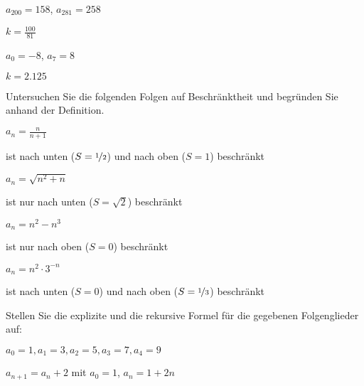 \begin{exercisesK}
\begin{exercise} $a_{200}=158$, $a_{281}=258$ \begin{answer}  $k=\frac{100}{81}$
\end{answer}
\end{exercise}

\begin{exercise} $a_{0}=-8$, $a_{7}=8$ \begin{answer}  $k=2.125$
\end{answer}
\end{exercise}
\endtwocol

Untersuchen Sie die folgenden Folgen auf Beschränktheit und begründen Sie anhand der Definition.

\twocol

\begin{exercise}$a_{n} = \frac{n}{n+1}$ \begin{answer}  ist nach unten ($S=\nicefrac{1}{2}$) und nach oben ($S=1$) beschränkt
\end{answer}
\end{exercise}

\begin{exercise}$a_{n} = \sqrt{n^{2}+n} $ \begin{answer}  ist nur nach unten ($S=\sqrt{2}$) beschränkt
\end{answer}
\end{exercise}

\begin{exercise}$a_{n} = n^{2} -n^{3} $ \begin{answer}  ist nur nach oben ($S=0$) beschränkt
\end{answer}
\end{exercise}

\begin{exercise}$a_{n} = n^{2}\cdot 3^{-n} $ \begin{answer}   ist nach unten ($S=0$) und nach oben ($S=\nicefrac{1}{3}$) beschränkt
\end{answer}
\end{exercise}

\endtwocol

Stellen Sie die explizite und die rekursive Formel für die gegebenen Folgenglieder auf:
\twocol

\begin{exercise} $a_{0}=1, a_{1}=3 ,a_{2}=5 ,a_{3}=7 , a_{4}=9 $ \begin{answer}
$a_{n+1} = a_{n}+2$ mit $a_{0}=1$, $a_{n}=1+2n$
\end{answer}
\end{exercise}


\end{exercisesK}
